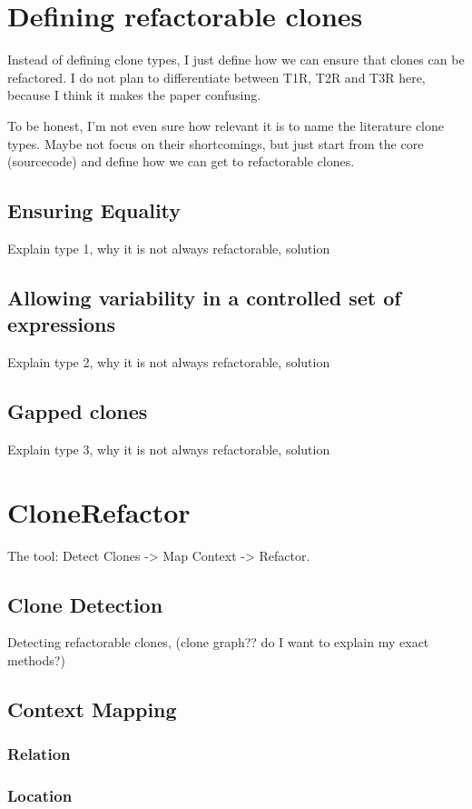 \documentclass[conference]{IEEEtran}
\begin{document}
\section{Defining refactorable clones}
Instead of defining clone types, I just define how we can ensure that clones can be refactored. I do not plan to differentiate between T1R, T2R and T3R here, because I think it makes the paper confusing.

To be honest, I'm not even sure how relevant it is to name the literature clone types. Maybe not focus on their shortcomings, but just start from the core (sourcecode) and define how we can get to refactorable clones.

\subsection{Ensuring Equality}
Explain type 1, why it is not always refactorable, solution

\subsection{Allowing variability in a controlled set of expressions}
Explain type 2, why it is not always refactorable, solution

\subsection{Gapped clones}
Explain type 3, why it is not always refactorable, solution

\section{CloneRefactor}
The tool: Detect Clones -> Map Context -> Refactor.

\subsection{Clone Detection}
Detecting refactorable clones, (clone graph?? do I want to explain my exact methods?)

\subsection{Context Mapping}
\subsubsection{Relation}
\subsubsection{Location}
\end{document}
